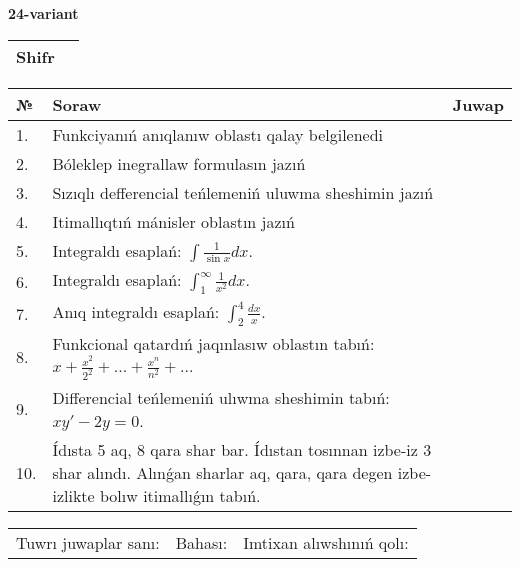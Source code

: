 \documentclass{article}
\begin{document}
  \egroup
  
  \newpage
  
  
  \textbf{24-variant}\\
  
  \bgroup
  \def\arraystretch{1.6} %
  
  \begin{tabular}{|m{5.7cm}|m{9.5cm}|}
  \hline
  Shifr & \\
  \hline
  \end{tabular}
  
  \vspace{1cm}
  
  \begin{tabular}{|m{0.7cm}|m{10cm}|m{4cm}|}
  \hline
  № & Soraw & Juwap \\
  \hline
  1. & Funkciyanıń anıqlanıw oblastı qalay belgilenedi &  \\
  \hline
  2. & Bóleklep inegrallaw formulasın jazıń &  \\
  \hline
  3. & Sızıqlı defferencial teńlemeniń uluwma sheshimin jazıń &  \\
  \hline
  4. & Itimallıqtıń mánisler oblastın jazıń &  \\
  \hline
  5. & Integraldı esaplań: \(\int{\frac{1}{\sin x}dx}\). &  \\
  \hline
  6. & Integraldı esaplań: \(\int_{1}^{\infty}{\frac{1}{x^2 }dx}\). &  \\
  \hline
  7. & Anıq integraldı esaplań: \(\int_{2}^{4}\frac{dx}{x}\). &  \\
  \hline
  8. & Funkcional qatardıń jaqınlasıw oblastın tabıń: \(x + \frac{x^2 }{2^2 } + ... + \frac{x^{n}}{n^2 } + ...\) &  \\
  \hline
  9. & Differencial teńlemeniń ulıwma sheshimin tabıń: \(xy' - 2y = 0\). &  \\
  \hline
  10. & Ídısta 5 aq, 8 qara shar bar. Ídıstan tosınnan izbe-iz 3 shar alındı. Alınǵan sharlar aq, qara, qara degen izbe-izlikte bolıw itimallıǵın tabıń. &  \\
  \hline
  \end{tabular}
  
  \vspace{1cm}
  
  \begin{tabular}{lll}
  Tuwrı juwaplar sanı: \underline{\hspace{1.5cm}} & 
  Bahası: \underline{\hspace{1.5cm}} & 
  Imtixan alıwshınıń qolı: \underline{\hspace{2cm}} \\
  \end{tabular}
  
\end{document}
